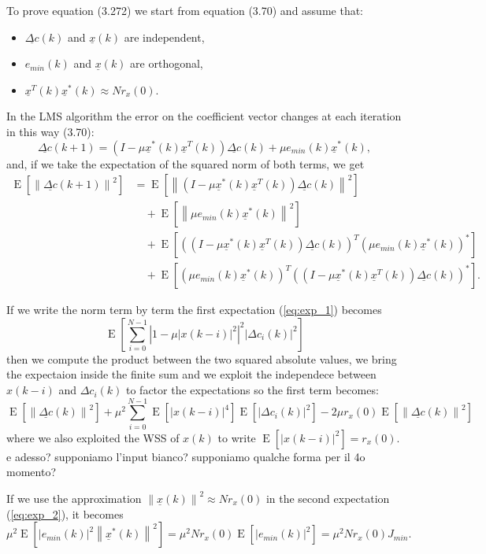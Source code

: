 \documentclass{article}
\renewcommand{\vec}[1]{\underline{#1}}
\newcommand{\E}[1]{\operatorname{E}\left[#1\right]}
\newcommand{\norm}[1]{\left\lVert#1\right\rVert}
\newcommand{\abs}[1]{\left|#1\right|}
\begin{document}
To prove equation (3.272) we start from equation (3.70) and assume
that:
\begin{itemize}
\item $\vec{\Delta c}(k)$ and $\vec{x}(k)$ are independent, 
\item $e_{min}(k)$ and $\vec{x}(k)$ are orthogonal, 
\item $\vec{x}^T(k)\vec{x}^*(k) \approx Nr_x(0)$.
\end{itemize}
In the LMS algorithm the error on the coefficient vector changes at each iteration in this way (3.70):
\begin{equation*}
  \vec{\Delta c}(k+1) = \left( I - \mu\vec{x}^*(k)\vec{x}^T(k) \right) \vec{\Delta c}(k) + \mu e_{min}(k)\vec{x}^*(k) , 
\end{equation*}
and, if we take the expectation of the squared norm of both terms, we get
\begin{align}
  \E{\norm{\vec{\Delta c}(k+1)}^2} %
  &= \E{\norm{\left( I - \mu\vec{x}^*(k)\vec{x}^T(k) \right) \vec{\Delta c}(k)}^2}
  \label{eq:exp_1} \\
  & \quad + \E{\norm{\mu e_{min}(k)\vec{x}^*(k)}^2}
  \label{eq:exp_2} \\
  & \quad + \E{\left(\left( I - \mu\vec{x}^*(k)\vec{x}^T(k) \right)\vec{\Delta c}(k)\right)^T\left(\mu e_{min}(k)\vec{x}^*(k)\right)^*}
  \label{eq:exp_3} \\
  & \quad + \E{\left(\mu e_{min}(k)\vec{x}^*(k)\right)^T\left(\left( I - \mu\vec{x}^*(k) \vec{x}^T(k)\right) \vec{\Delta c}(k)\right)^*}
  \label{eq:exp_4} .
\end{align}

If we write the norm term by term the first expectation
(\ref{eq:exp_1}) becomes
\[ \E{\sum_{i=0}^{N-1}\abs{1 - \mu\abs{x(k-i)}^2}^2\abs{\Delta c_i(k)}^2} \]
then we compute the product between the two squared absolute values,
we bring the expectaion inside the finite sum and we exploit the
independece between $x(k-i)$ and $\Delta c_i(k)$ to factor the
expectations so the first term becomes:
\[ \E{\norm{\vec{\Delta c}(k)}^2} +
\mu^2\sum_{i=0}^{N-1}\E{\abs{x(k-i)}^4}\E{\abs{\Delta c_i(k)}^2} - 2\mu
r_x(0)\E{\norm{\vec{\Delta c}(k)}^2}
\]
where we also exploited the WSS of $x(k)$ to write $\E{\abs{x(k-i)}^2}
= r_x(0)$. {\color{red} e adesso? supponiamo l'input bianco? supponiamo qualche forma per il 4o momento?}

If we use the approximation $\norm{\vec{x}(k)}^2 \approx Nr_x(0)$ in
the second expectation (\ref{eq:exp_2}), it becomes
\[
\mu^2 \E{\abs{e_{min}(k)}^2 \norm{\vec{x}^*(k)}^2}
= \mu^2Nr_x(0)\E{\abs{e_{min}(k)}^2}
= \mu^2Nr_x(0)J_{min} .
\]
\end{document}
